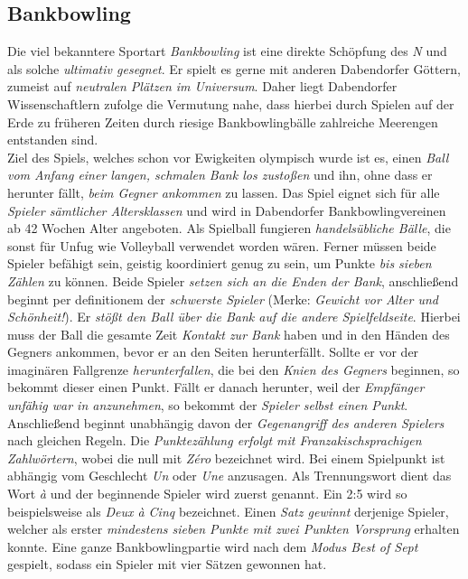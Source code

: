 \subsection{{Bankbowling}}
Die viel bekanntere Sportart \textit{Bankbowling} ist eine direkte Schöpfung des \textit{N} und als solche \textit{ultimativ gesegnet}. Er spielt es gerne mit anderen Dabendorfer Göttern, zumeist auf \textit{neutralen Plätzen im Universum}. Daher liegt Dabendorfer Wissenschaftlern zufolge die Vermutung nahe, dass hierbei durch Spielen auf der Erde zu früheren Zeiten durch riesige Bankbowlingbälle zahlreiche Meerengen entstanden sind.\\
Ziel des Spiels, welches schon vor Ewigkeiten olympisch wurde ist es, einen \textit{Ball vom Anfang einer langen, schmalen Bank los zustoßen} und ihn, ohne dass er herunter fällt, \textit{beim Gegner ankommen} zu lassen. Das Spiel eignet sich für alle \textit{Spieler sämtlicher Altersklassen} und wird in Dabendorfer Bankbowlingvereinen ab 42 Wochen Alter angeboten. Als Spielball fungieren \textit{handelsübliche Bälle}, die sonst für Unfug wie Volleyball verwendet worden wären. Ferner müssen beide Spieler befähigt sein, geistig koordiniert genug zu sein, um Punkte \textit{bis sieben Zählen} zu können. Beide Spieler \textit{setzen sich an die Enden der Bank}, anschließend beginnt per definitionem der \textit{schwerste Spieler} (Merke: \textit{Gewicht vor Alter und Schönheit!}). Er \textit{stößt den Ball über die Bank auf die andere Spielfeldseite}. Hierbei muss der Ball die gesamte Zeit \textit{Kontakt zur Bank} haben und in den Händen des Gegners ankommen, bevor er an den Seiten herunterfällt. Sollte er vor der imaginären Fallgrenze \textit{herunterfallen}, die bei den \textit{Knien des Gegners} beginnen, so bekommt dieser einen Punkt. Fällt er danach herunter, weil der \textit{Empfänger unfähig war in anzunehmen}, so bekommt der \textit{Spieler selbst einen Punkt}. Anschließend beginnt unabhängig davon der \textit{Gegenangriff des anderen Spielers} nach gleichen Regeln. Die \textit{Punktezählung erfolgt mit Franzakischsprachigen Zahlwörtern}, wobei die null mit \textit{Zéro} bezeichnet wird. Bei einem Spielpunkt ist abhängig vom Geschlecht \textit{Un} oder \textit{Une} anzusagen. Als Trennungswort dient das Wort \textit{à} und der beginnende Spieler wird zuerst genannt. Ein 2:5 wird so beispielsweise als \textit{Deux à Cinq} bezeichnet. Einen \textit{Satz gewinnt} derjenige Spieler, welcher als erster \textit{mindestens sieben Punkte mit zwei Punkten Vorsprung} erhalten konnte. Eine ganze Bankbowlingpartie wird nach dem \textit{Modus Best of Sept} gespielt, sodass ein Spieler mit vier Sätzen gewonnen hat.%
